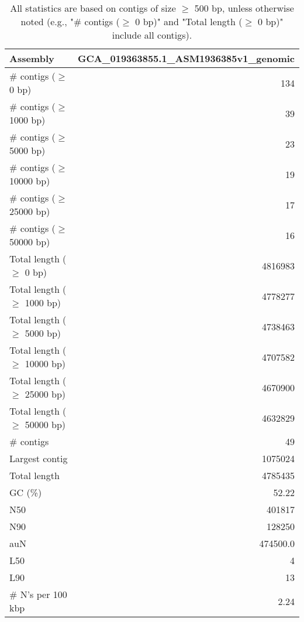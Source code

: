 \documentclass[12pt,a4paper]{article}
\begin{document}
\begin{table}[ht]
\begin{center}
\caption{All statistics are based on contigs of size $\geq$ 500 bp, unless otherwise noted (e.g., "\# contigs ($\geq$ 0 bp)" and "Total length ($\geq$ 0 bp)" include all contigs).}
\begin{tabular}{|l*{1}{|r}|}
\hline
Assembly & GCA\_019363855.1\_ASM1936385v1\_genomic \\ \hline
\# contigs ($\geq$ 0 bp) & 134 \\ \hline
\# contigs ($\geq$ 1000 bp) & 39 \\ \hline
\# contigs ($\geq$ 5000 bp) & 23 \\ \hline
\# contigs ($\geq$ 10000 bp) & 19 \\ \hline
\# contigs ($\geq$ 25000 bp) & 17 \\ \hline
\# contigs ($\geq$ 50000 bp) & 16 \\ \hline
Total length ($\geq$ 0 bp) & 4816983 \\ \hline
Total length ($\geq$ 1000 bp) & 4778277 \\ \hline
Total length ($\geq$ 5000 bp) & 4738463 \\ \hline
Total length ($\geq$ 10000 bp) & 4707582 \\ \hline
Total length ($\geq$ 25000 bp) & 4670900 \\ \hline
Total length ($\geq$ 50000 bp) & 4632829 \\ \hline
\# contigs & 49 \\ \hline
Largest contig & 1075024 \\ \hline
Total length & 4785435 \\ \hline
GC (\%) & 52.22 \\ \hline
N50 & 401817 \\ \hline
N90 & 128250 \\ \hline
auN & 474500.0 \\ \hline
L50 & 4 \\ \hline
L90 & 13 \\ \hline
\# N's per 100 kbp & 2.24 \\ \hline
\end{tabular}
\end{center}
\end{table}
\end{document}
